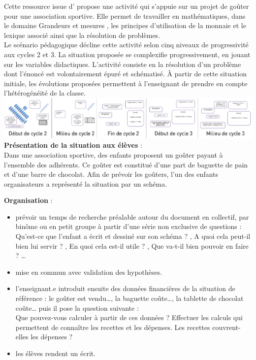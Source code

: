 {\begin{exercice*}
   Cette ressource issue d'{} propose une activité qui s’appuie sur un projet de goûter pour une association sportive. Elle permet de travailler en mathématiques, dans le domaine \og Grandeurs et mesures \fg, les principes d’utilisation de la monnaie et le lexique associé ainsi que la résolution de problèmes. \\
   Le scénario pédagogique décline cette activité selon cinq niveaux de progressivité aux cycles 2 et 3. La situation proposée se complexifie progressivement, en jouant sur les variables didactiques. L’activité consiste en la résolution d’un problème dont l’énoncé est volontairement épuré et schématisé. À partir de cette situation initiale, les évolutions proposées permettent à l’enseignant de prendre en compte l’hétérogénéité de la classe. \\ [4mm]
   \includegraphics[width=17cm]{Grandeurs_mesures_did/Images/Grm7_activite_gouters} \\ [2mm]
{\bf Présentation de la situation aux élèves} : \\
\og Dans une association sportive, des enfants proposent un goûter payant à l’ensemble des adhérents. Ce goûter est constitué d’une part de baguette de pain et d’une barre de chocolat. Afin de prévoir les goûters, l’un des enfants organisateurs a représenté la situation par un schéma. \fg

{\bf Organisation} :
\begin{itemize}
   \item prévoir un temps de recherche préalable autour du document en collectif, par binôme ou en petit groupe à partir d’une série non exclusive de questions : \og Qu’est-ce que l’enfant a écrit et dessiné sur son schéma ? \fg, \og A quoi cela peut-il bien lui servir ? \fg, \og En quoi cela est-il utile ? \fg, \og Que va-t-il bien pouvoir en faire ? \fg\dots
   \item mise en commun avec validation des hypothèses.
   \item l’enseignant.e introduit ensuite des données financières de la situation de référence : le goûter est vendu\dots, la baguette coûte\dots, la tablette de chocolat coûte\dots{} puis il pose la question suivante : \\
   \og Que pouvez-vous calculer à partir de ces données ? Effectuer les calculs qui permettent de connaître les recettes et les dépenses. Les recettes couvrent-elles les dépenses ? \fg
   \item les élèves rendent un écrit. \\
\end{itemize}



\end{exercice*}}
